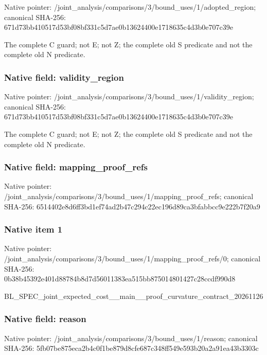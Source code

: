 \documentclass[10pt,a4paper]{article}
\begin{document}
Native pointer: /joint\_analysis/comparis\allowbreak{}ons/3/bound\_uses/1/adopt\allowbreak{}ed\_region; canonical SHA-256: 671d73bb410517d53bf08bf3\allowbreak{}31c5d7ae0b13624400e17186\allowbreak{}35c4d3b0e707c39e


The complete C guard; not E; not Z; the complete old S predicate and not the complete old N predicate.


\subsubsection{Native field: validity\_region}


Native pointer: /joint\_analysis/comparis\allowbreak{}ons/3/bound\_uses/1/valid\allowbreak{}ity\_region; canonical SHA-256: 671d73bb410517d53bf08bf3\allowbreak{}31c5d7ae0b13624400e17186\allowbreak{}35c4d3b0e707c39e


The complete C guard; not E; not Z; the complete old S predicate and not the complete old N predicate.


\subsubsection{Native field: mapping\_proof\_refs}


Native pointer: /joint\_analysis/comparis\allowbreak{}ons/3/bound\_uses/1/mappi\allowbreak{}ng\_proof\_refs; canonical SHA-256: 6514402e8d6ff3bd1ef74ad2\allowbreak{}b47c294c22ec196d89ca3bfa\allowbreak{}bbcc9e222b7f20a9



\subsubsection{Native item 1}


Native pointer: /joint\_analysis/comparis\allowbreak{}ons/3/bound\_uses/1/mappi\allowbreak{}ng\_proof\_refs/0; canonical SHA-256: 0b38b45392e401d88784b8d7\allowbreak{}d56011383ea515bb87501480\allowbreak{}1427c28ccdf990d8


BL\_SPEC\_joint\_expected\_c\allowbreak{}ost\_\_main\_\_proof\_curvatu\allowbreak{}re\_contract\_20261126


\subsubsection{Native field: reason}


Native pointer: /joint\_analysis/comparis\allowbreak{}ons/3/bound\_uses/1/reaso\allowbreak{}n; canonical SHA-256: 5fb07be875eca2b4c0f1be87\allowbreak{}9d8cfe687c348ff549e593b2\allowbreak{}0a2a91ea43b3303c
\end{document}
